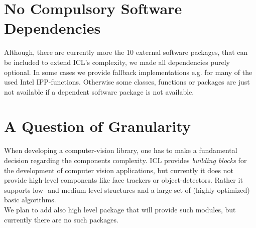  
\section{No Compulsory Software Dependencies}
Although, there are currently more the 10 external software packages, that can be included to extend ICL's complexity, we made all dependencies purely optional. In some cases we provide fallback implementations e.g. for many of the used Intel IPP-functions. Otherwise some classes, functions or packages are just not available if a dependent software package is not available.

\section{A Question of Granularity}
When developing a computer-vision library, one has to make a fundamental decision regarding the components complexity. ICL provides \emph{building blocks} for the development of computer vision applications, but currently it does not provide high-level components like face trackers or object-detectors. Rather it supports low- and medium level structures and a large set of (highly optimized) basic algorithms.\\
We plan to add also high level package that will provide such modules, but currently there are no such packages.


